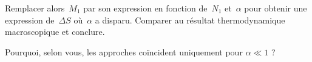\documentclass[utf8, 11pt]{feuille}
\begin{document}
\question
Remplacer alors~$M_1$ par son expression en fonction de~$N_1$
et~$\alpha$ pour obtenir une expression de~$\Delta S$ où~$\alpha$ a
disparu. Comparer au résultat thermodynamique macroscopique et conclure.

\question Pourquoi, selon vous, les approches coïncident uniquement pour $\alpha \ll 1$ ?
\end{document}
